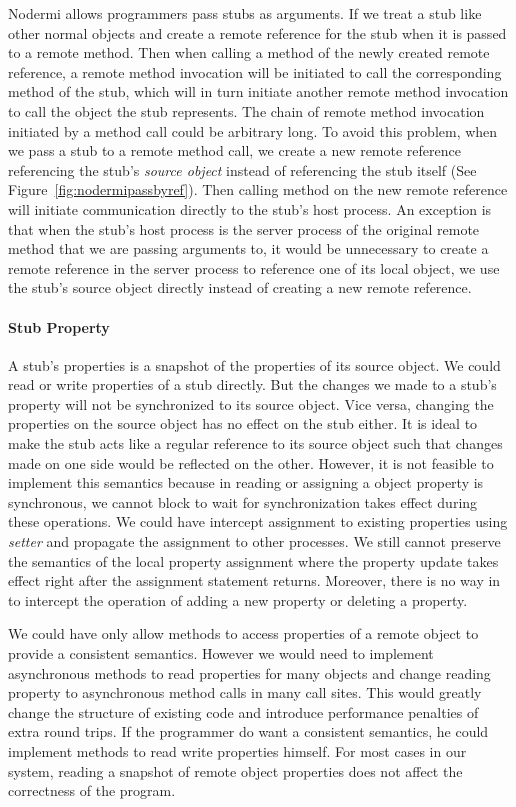 Nodermi allows programmers pass stubs as arguments.
If we treat a stub like other normal objects and create a remote reference 
 for the stub when it is passed to a remote method. 
Then when calling a method of the newly created remote reference,
a remote method invocation will be initiated to call the corresponding method
of the stub, which will in turn initiate another remote method invocation
to call the object the stub represents.
The chain of remote method invocation initiated by a method call could
be arbitrary long.
To avoid this problem, when we pass a stub to a remote method call,
we create a new remote reference referencing 
 the stub's \emph{source object} instead of referencing the stub itself
 (See Figure~\ref{fig:nodermipassbyref}).
Then calling method on the new remote reference will initiate 
communication directly to the stub's host process.
An exception is that when the stub's host process is the server
process of the original remote method that we are passing arguments to,
it would be unnecessary to create a remote reference 
in the server process to reference one of its local object,
we use the stub's source object directly instead of 
creating a new remote reference.


\paragraph{Stub Property}
A stub's properties is a snapshot of the properties
of its source object.
We could read or write properties of a stub directly.
But the changes we made to a stub's property
will not be synchronized to its source object.
Vice versa,
changing the properties on the source object has no effect
on the stub either.
It is ideal to make the stub acts like a regular reference
to its source object such that
changes made on one side would be reflected on the other.
However, it is not feasible to implement this semantics because
in \js{} reading or assigning a object property is synchronous,
we cannot block to wait for synchronization takes effect
 during these operations.
We could have intercept assignment to existing properties using
\emph{setter} and propagate the assignment to other processes.
We still cannot preserve the semantics of the local property assignment
where the property update takes effect right after the assignment statement returns.
Moreover, there is no way in \js{} to intercept the operation of
adding a new property or deleting a property.

We could have only allow methods to access properties of a remote object
to provide a consistent semantics.
However we would need to implement asynchronous methods to read properties
for many objects
and change reading property to asynchronous method calls in many
call sites.
This would greatly change the structure of existing code
and introduce performance penalties of extra round trips.
If the programmer do want a consistent semantics,
he could implement methods to read write properties himself.
For most cases in our system, reading a snapshot of remote object properties
does not affect the correctness of the program.


